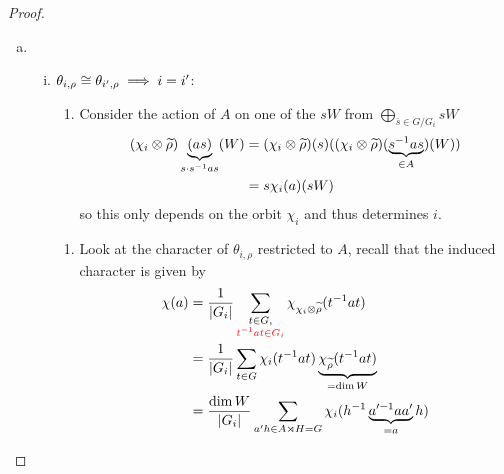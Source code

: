 \documentclass[a4paper]{article}
\begin{document}
\begin{prop} [Proposition 25]
\begin{proof}
\begin{enumerate}[(a)]
\begin{enumerate}[(i)]
\begin{itemize}
                \end{itemize}
                So mackey's criterion $\imp \theta_{i, \rho} = \ind_{G_{i}}^{G}(\ph)$ is irred.
        \end{enumerate}
  \item
        \begin{enumerate}[(i)]
          \item $\theta_{i,\rho} \cong \theta_{i', \rho} \implies i = i'$:
                \begin{enumerate}
                  \item Consider the action of $A$ on one of the $sW$ from $\bigoplus_{\bar s \in G/G_{i}}sW$
                        \begin{align}
                          (\chi_{i} \otimes \widetilde \rho)\underbrace{(as)}_{s\cdot s^{-1}as}(W) &= (\chi_{i} \otimes \widetilde \rho)(s)((\chi_{i} \otimes \widetilde \rho)(\underbrace{s^{-1}as}_{ \in A})(W)) \\
                          &= s\chi_{i}(a) (sW)
                        \end{align}
                        so this only depends on the orbit $\chi_{i}$ and thus determines $i$.
                \end{enumerate}
                \begin{enumerate}[1.]
                  \item Look at the character of $\theta_{i,\rho}$ restricted to $A$, recall that the induced character is given by
                        \begin{align}
                          \chi(a) &= \frac 1{|G_{i}|} \sum_{\substack{t \in G,\\\color{red}t^{-1}at \in G_{i}}}\chi_{\chi_{i} \otm \tilde \rho}(t^{-1}at) \\
                          &= \frac 1{|G_{i}|}\sum_{t \in G}\chi_{i}(t^{-1}at)\ubr{\chi_{\tilde\rho}(t^{-1}at)}_{= \dim W} \\
                          &= \frac {\dim W}{|G_{i}|} \sum_{a' h \in A \rtimes H=G} \chi_{i}(h^{-1}\ubr{a'^{-1}aa'}_{=a}h)\\

\end{align}
\end{enumerate}
\end{enumerate}
\end{enumerate}
\end{proof}
\end{prop}
\end{document}
